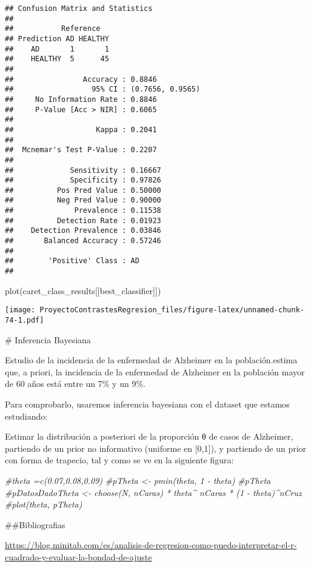 \documentclass[
]{article}
\newenvironment{Shaded}{\begin{snugshade}}{\end{snugshade}}
\newcommand{\CommentTok}[1]{\textcolor[rgb]{0.56,0.35,0.01}{\textit{#1}}}
\newcommand{\FunctionTok}[1]{\textcolor[rgb]{0.00,0.00,0.00}{#1}}
\newcommand{\NormalTok}[1]{#1}
\begin{document}
\begin{verbatim}
## Confusion Matrix and Statistics
## 
##           Reference
## Prediction AD HEALTHY
##    AD       1       1
##    HEALTHY  5      45
##                                           
##                Accuracy : 0.8846          
##                  95% CI : (0.7656, 0.9565)
##     No Information Rate : 0.8846          
##     P-Value [Acc > NIR] : 0.6065          
##                                           
##                   Kappa : 0.2041          
##                                           
##  Mcnemar's Test P-Value : 0.2207          
##                                           
##             Sensitivity : 0.16667         
##             Specificity : 0.97826         
##          Pos Pred Value : 0.50000         
##          Neg Pred Value : 0.90000         
##              Prevalence : 0.11538         
##          Detection Rate : 0.01923         
##    Detection Prevalence : 0.03846         
##       Balanced Accuracy : 0.57246         
##                                           
##        'Positive' Class : AD              
## 
\end{verbatim}

\begin{Shaded}
\begin{Highlighting}[]
\FunctionTok{plot}\NormalTok{(caret\_class\_results[[best\_classifier]])}
\end{Highlighting}
\end{Shaded}

\texttt{[image: ProyectoContrastesRegresion\_files/figure-latex/unnamed-chunk-74-1.pdf]}

\# Inferencia Bayesiana

Estudio de la incidencia de la enfermedad de Alzheimer en la
población.estima que, a priori, la incidencia de la enfermedad de
Alzheimer en la población mayor de 60 años está entre un 7\% y un 9\%.

Para comprobarlo, usaremos inferencia bayesiana con el dataset que
estamos estudiando:

Estimar la distribución a posteriori de la proporción θ de casos de
Alzheimer, partiendo de un prior no informativo (uniforme en {[}0,1{]}),
y partiendo de un prior con forma de trapecio, tal y como se ve en la
siguiente figura:

\begin{Shaded}
\begin{Highlighting}[]
\CommentTok{\#theta =c(0.07,0.08,0.09)}
\CommentTok{\#pTheta \textless{}{-} pmin(theta, 1 {-} theta)}
\CommentTok{\#pTheta}
\CommentTok{\#pDatosDadoTheta \textless{}{-} choose(N, nCaras) * theta\^{} nCaras * (1 {-} theta)\^{}nCruz}
\CommentTok{\#plot(theta, pTheta)}
\end{Highlighting}
\end{Shaded}

\#\#Bibliografias

\url{https://blog.minitab.com/es/analisis-de-regresion-como-puedo-interpretar-el-r-cuadrado-y-evaluar-la-bondad-de-ajuste}
\end{document}
